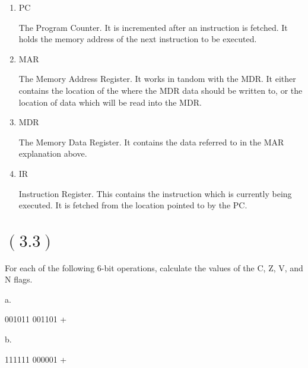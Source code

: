 \documentclass[letterpaper,12pt,titlepage]{article}
\begin{document}
\renewcommand{\labelenumi}{\alph{enumi})}
\begin{enumerate}
\item PC

\begin{mdframed}[style=MyFrame]

The Program Counter. It is incremented after an instruction is fetched. It holds the memory address of the next instruction to be executed.

\end{mdframed}

\item MAR

\begin{mdframed}[style=MyFrame]

The Memory Address Register. It works in tandom with the MDR. It either contains the location of the where the MDR data should be written to, or the location of data which will be read into the MDR.

\end{mdframed}

\item MDR 

\begin{mdframed}[style=MyFrame]

The Memory Data Register. It contains the data referred to in the MAR explanation above.

\end{mdframed}

\item IR

\begin{mdframed}[style=MyFrame]

Instruction Register. This contains the instruction which is currently being executed. It is fetched from the location pointed to by the PC.

\end{mdframed}

\end{enumerate}

\section*{$(3.3)$} For each of the following 6-bit operations, calculate the values of the C, Z, V, and N flags.

a.

001011
001101
+

b. 

111111
000001
+
\end{document}
